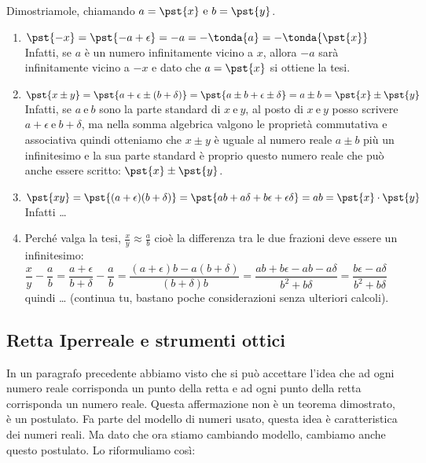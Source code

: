 Dimostriamole, chiamando \(a=\pst{x} ~ \text{e} ~ b=\pst{y}\).
\begin{enumerate}%
 \item \(\pst{-x}=\pst{-a +\epsilon}=-a=-\tonda{a}=-\tonda{\pst{x}}\)\\
Infatti, se \(a\) è un numero infinitamente vicino a \(x\), allora \(-a\) 
sarà infinitamente vicino a \(-x\) e dato che \(a=\pst{x}\) si ottiene la 
tesi.
 \item \(\pst{x \pm y} = \pst{a+\epsilon \pm (b+\delta)}= 
         \pst{a\pm b+\epsilon \pm \delta}= a\pm b = \pst{x}\pm\pst{y}\)\\
Infatti, 
se \(a ~ \text{e} ~ b\) sono la parte standard di \(x ~ \text{e} ~ y\),
al posto di \(x ~ \text{e} ~ y\) posso scrivere 
\(a+\epsilon ~ \text{e} ~ b+\delta\), ma nella somma algebrica valgono le 
proprietà commutativa e associativa quindi otteniamo che \(x \pm y\) è 
uguale al numero reale \(a \pm b\) più un infinitesimo e la sua parte 
standard è proprio questo numero reale che può anche essere scritto:
\(\pst{x}\pm\pst{y}\).
 \item\(\pst{xy} = \pst{(a+\epsilon)(b+\delta)}=
        \pst{ab+a\delta+b\epsilon+\epsilon\delta}=ab=
        \pst{x} \cdot \pst{y}\) \\
Infatti \dots
 \item Perché valga la tesi, \(\frac{x}{y} \approx \frac{a}{b}\) cioè la 
differenza tra le due frazioni deve essere un infinitesimo:\\
\(\dfrac{x}{y}- \dfrac{a}{b}=\dfrac{a+\epsilon}{b+\delta}-\dfrac{a}{b}=
  \dfrac{(a+\epsilon)b-a(b+\delta)}{(b+\delta)b}=
  \dfrac{ab+b\epsilon-ab-a\delta}{b^2+b\delta}=
  \dfrac{b\epsilon-a\delta}{b^2+b\delta}\)\\ quindi \dots
(continua tu, bastano poche considerazioni senza ulteriori calcoli).
\end{enumerate}

\subsection{Retta Iperreale e strumenti ottici}
\label{subsec:insnum_retta}

In un paragrafo precedente abbiamo visto che si può accettare l'idea che 
ad ogni numero reale corrisponda un punto della retta e ad ogni 
punto della retta corrisponda un numero reale. 
Questa affermazione non è un teorema dimostrato, è un postulato. 
Fa parte del modello di numeri usato, questa idea è caratteristica dei 
numeri reali. 
Ma dato che ora stiamo cambiando modello, cambiamo anche questo postulato. 
Lo riformuliamo così:

